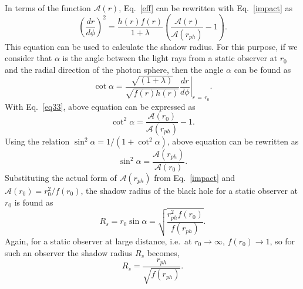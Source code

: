 \documentclass[aps,amsmath,amssymb,showpacs,showkeys]{revtex4}
\begin{document}
In terms of the function $\mathcal{A}(r)$, Eq.\ \eqref{eff} can be rewritten 
with Eq.\ \eqref{impact} as 
\begin{equation}
\left(\frac{dr}{d\phi}\right)^{\!2}=\frac{h(r)f(r)}{1+\lambda}\left(\frac{\mathcal{A}(r)}{\mathcal{A}(r_{ph})}-1\right).
\label{eq33}
\end{equation}
This equation can be used to calculate the shadow radius. For this purpose, if 
we consider that $\alpha$ is the angle between the light rays from a static 
observer at $r_0$ and the radial direction of the photon sphere, then the
angle $\alpha$ can be found as \cite{Perlick:2021aok, 18}
\begin{equation}
\cot\alpha=\frac{\sqrt{(1+\lambda)}}{\sqrt{f(r)h(r)}}\left.\frac{dr}{d\phi}\right|_{r\,=\,r_{0}}\!\!\!\!\!\!\!\!\!\!\!.
\end{equation}
With Eq.\ \eqref{eq33}, above equation can be expressed as 
\begin{equation}
\cot^{2}\!\alpha=\frac{\mathcal{A}(r_{0})}{\mathcal{A}(r_{ph})}-1.
\end{equation}
Using the relation $\sin^{2}\!\alpha=1/(1+\cot^{2}\!\alpha)$, above equation 
can be rewritten as
\begin{equation}
\sin^{2}\!\alpha=\frac{\mathcal{A}(r_{ph})}{\mathcal{A}(r_{0})}.
\end{equation}
Substituting the actual form of $\mathcal{A}(r_{ph})$ from Eq.\ \eqref{impact} 
and $\mathcal{A}(r_{0}) = r_0^2/f(r_0)$,
the shadow radius of the black hole for a static observer at $r_{0}$
is found as \cite{15s} 
\begin{equation}
R_{s}=r_{0}\sin\alpha=\sqrt{\frac{r_{ph}^2f(r_{0})}{f\left(r_{ph}\right)}}.
\end{equation}
Again, for a static observer at large distance, 
i.e.\ at $r_0 \rightarrow \infty$, $f(r_0) \rightarrow 1$, so for such an 
observer the shadow radius $R_s$ becomes, 
\begin{equation}
R_{s} = \frac{r_{ph}}{\sqrt{f(r_{ph})}}.
\end{equation}
\end{document}
